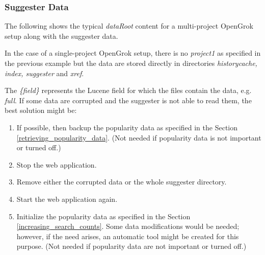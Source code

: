 \subsubsection{Suggester Data}
The following shows the typical \textit{dataRoot} content for a multi-project OpenGrok setup along with the suggester data.

In the case of a single-project OpenGrok setup, there is no \textit{project1} as specified in the previous example but the
data are stored directly in directories \textit{historycache, index, suggester} and \textit{xref}.

The \textit{\{field\}} represents the Lucene field for which the files contain the data, e.g. \textit{full}.
If some data are corrupted and
the suggester is not able to read them, the best solution might be:
\begin{enumerate}
    \item If possible, then backup the popularity data as specified in the Section \ref{retrieving_popularity_data}. (Not needed
    if popularity data is not important or turned off.)
    \item Stop the web application.
    \item Remove either the corrupted data or the whole suggester directory.
    \item Start the web application again.
    \item Initialize the popularity data as specified in the Section \ref{increasing_search_counts}. Some data modifications would
    be needed; however, if the need arises, an automatic tool might be created for this purpose. (Not needed
    if popularity data are not important or turned off.)
\end{enumerate}


